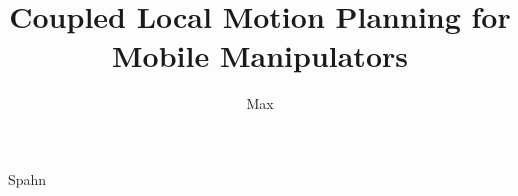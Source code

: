 \documentclass{TUD-dissertation2020}
\newif\iftrackchanges
\begin{document}
\trackchangesfalse



\title[Geometric Control]{Coupled Local Motion Planning for Mobile Manipulators}
\author{Max}{Spahn}
\maketitle

\frontmatter


\mainmatter

\thumbtrue




\appendix

%

\thumbfalse
\end{document}
